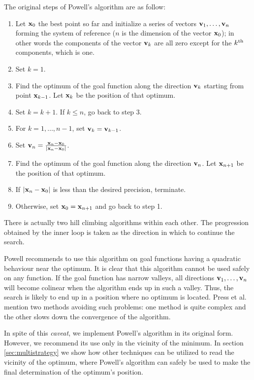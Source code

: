 \documentclass[twoside]{book}
\begin{document}
\noindent The original steps of Powell's algorithm are as follow:
\begin{enumerate}
  \item Let ${\bf x}_0$ the best point so far and initialize a
  series of vectors ${\bf v}_1,\ldots,{\bf v}_n$ forming the system
  of reference ($n$ is the
  dimension of the vector ${\bf x}_0$); in
  other words the components of the vector ${\bf v}_k$ are all
  zero except for the $k^{\mathop{\rm th}}$ components, which is one.
  \item Set $k=1$.
  \item Find the optimum of the goal function along the direction ${\bf
  v}_k$ starting from point ${\bf x}_{k-1}$. Let ${\bf x}_k$  be
  the position of that optimum.
  \item Set $k=k+1$. If $k\leq n$, go back to step 3.
  \item For $k=1,\ldots,n-1$, set ${\bf v}_k={\bf v}_{k-1}$.
  \item Set ${\bf v}_n ={ {\bf x}_n-{\bf x}_0 \over \left| {\bf x}_n-{\bf x}_0\right|}$.
  \item Find the optimum of the goal function along the direction ${\bf
  v}_n$. Let ${\bf x}_{n+1}$  be the position of that optimum.
  \item If $\left| {\bf x}_n-{\bf x}_0\right|$ is less than the
  desired precision, terminate.
  \item Otherwise, set ${\bf x}_0={\bf x}_{n+1}$ and go back to
  step 1.
\end{enumerate}
There is actually two hill climbing algorithms within each other.
The progression obtained by the inner loop is taken as the
direction in which to continue the search.

Powell recommends to use this algorithm on goal functions having a
quadratic behaviour near the optimum. It is clear that this
algorithm cannot be used safely on any function. If the goal
function has narrow valleys, all directions ${\bf v}_1,\ldots,{\bf
v}_n$ will become colinear when the algorithm ends up in such a
valley. Thus, the search is likely to end up in a position where
no optimum is located. Press et al. \cite{Press} mention two
methods avoiding such problems: one method is quite complex and
the other slows down the convergence of the algorithm.

In spite of this {\it caveat}, we implement Powell's algorithm in
its original form. However, we recommend its use only in the
vicinity of the minimum. In section \ref{sec:multistrategy} we
show how other techniques can be utilized to read the vicinity of
the optimum, where Powell's algorithm can safely be used to make
the final determination of the optimum's position.
\end{document}
